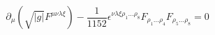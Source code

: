 \begin{equation}
\partial_\mu\left(\sqrt{|g|}F^{\mu\nu\lambda\xi}\right)
-\frac{1}{1152}\epsilon^{\nu\lambda\xi\rho_1\ldots\rho_8}F_{\rho_1\ldots\rho_4}F_{\rho_5\ldots\rho_8}=0
\end{equation}

